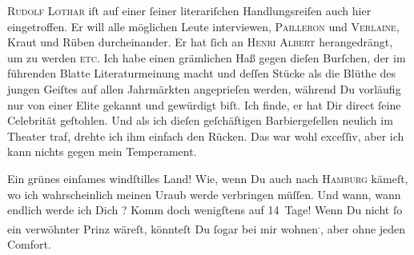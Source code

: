 \pstart
           \textsc{Rudolf Lothar} iſt auf einer{ }ſeiner literariſchen Handlungsreiſen auch hier eingetroffen. Er will alle {\pb}möglichen Leute interviewen, \textsc{Pailleron} und \textsc{Verlaine}, Kraut und Rüben durcheinander. Er hat{ }ſich an \textsc{Henri Albert} herangedrängt, um \label{K_L02619-6v}\label{K_L02619-6} zu
               werden \textsc{etc}. Ich habe einen grämlichen Haß gegen dieſen Burſchen, der im führenden Blatte Literaturmeinung macht
               und deſſen Stücke als die Blüthe des jungen Geiſtes \strikeout{\textcolor{gray}{a}\textcolor{gray}{×}} auf allen Jahrmärkten angeprieſen werden, während Du vorläufig nur von einer
               Elite gekannt und gewürdigt biſt. Ich finde, er hat Dir direct{ }ſeine Celebrität
               geſtohlen. Und als ich dieſen geſchäftigen {\pb}Barbiergeſellen neulich im
               Theater traf, drehte ich ihm einfach den Rücken. Das war wohl exceſſiv, aber ich kann
               nichts gegen mein Temperament.\pend
           
\pstart
           Ein grünes einſames windſtilles Land! Wie, wenn Du auch nach \textsc{Hamburg} kämeſt, wo ich wahrscheinlich meinen Uraub werde verbringen müſſen. Und wann,
               wann endlich werde ich Dich \label{K_L02619-7v}\label{K_L02619-7}? Komm doch
               wenigſtens auf 14 Tage! Wenn Du nicht{ }ſo ein verwöhnter Prinz wäreſt, könnteſt Du{ }ſogar bei mir wohnen\substVorne{}\textsuperscript{.}\substDazwischen{},\substHinten{} aber ohne jeden Comfort.\pend
           
